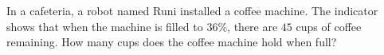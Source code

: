 In a cafeteria, a robot named Runi installed a coffee machine. The indicator shows that when the machine is filled to $36\%$, there are $45$ cups of coffee remaining. How many cups does the coffee machine hold when full?
